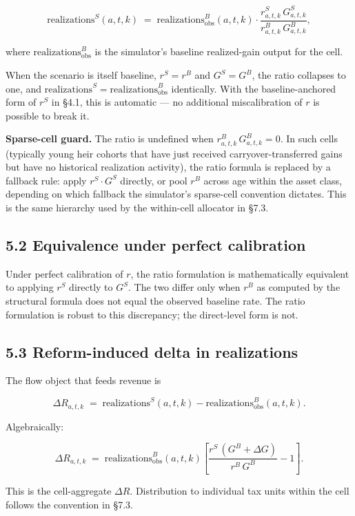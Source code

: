 \documentclass[11pt]{article}
\begin{document}
\[
\boxed{
\text{realizations}^S(a, t, k)
\;=\;
\text{realizations}^B_{\text{obs}}(a, t, k) \cdot
\frac{r^S_{a,t,k}\,G^S_{a,t,k}}{r^B_{a,t,k}\,G^B_{a,t,k}},
}
\]

where $\text{realizations}^B_{\text{obs}}$ is the simulator's baseline realized-gain output for the cell.

When the scenario is itself baseline, $r^S = r^B$ and $G^S = G^B$, the ratio collapses to one, and $\text{realizations}^S = \text{realizations}^B_{\text{obs}}$ identically. With the baseline-anchored form of $r^S$ in §4.1, this is automatic — no additional miscalibration of $r$ is possible to break it.

\textbf{Sparse-cell guard.} The ratio is undefined when $r^B_{a,t,k}\,G^B_{a,t,k}
= 0$. In such cells (typically young heir cohorts that have just received carryover-transferred gains but have no historical realization activity), the ratio formula is replaced by a fallback rule: apply $r^S \cdot G^S$ directly, or pool $r^B$ across age within the asset class, depending on which fallback the simulator's sparse-cell convention dictates. This is the same hierarchy used by the within-cell allocator in §7.3.

\subsection*{5.2 Equivalence under perfect calibration}

Under perfect calibration of $r$, the ratio formulation is mathematically equivalent to applying $r^S$ directly to $G^S$. The two differ only when $r^B$ as computed by the structural formula does not equal the observed baseline rate. The ratio formulation is robust to this discrepancy; the direct-level form is not.

\subsection*{5.3 Reform-induced delta in realizations}

The flow object that feeds revenue is

\[
\Delta R_{a, t, k}
\;=\;
\text{realizations}^S(a, t, k) - \text{realizations}^B_{\text{obs}}(a, t, k).
\]

Algebraically:

\[
\Delta R_{a, t, k}
\;=\;
\text{realizations}^B_{\text{obs}}(a, t, k) \left[
\frac{r^S\,(G^B + \Delta G)}{r^B\,G^B} - 1
\right].
\]

This is the cell-aggregate $\Delta R$. Distribution to individual tax units within the cell follows the convention in §7.3.
\end{document}
